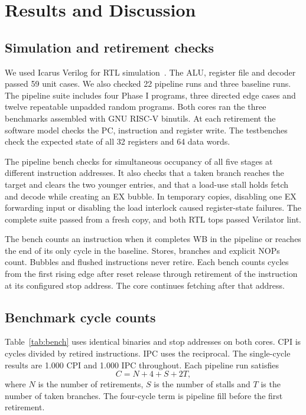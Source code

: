 \documentclass[conference]{IEEEtran}
\begin{document}
\section{Results and Discussion}
\subsection{Simulation and retirement checks}
We used Icarus Verilog for RTL simulation~\cite{icarus}. The ALU, register file and decoder passed 59 unit cases. We also checked 22 pipeline runs and three baseline runs. The pipeline suite includes four Phase I programs, three directed edge cases and twelve repeatable unpadded random programs. Both cores ran the three benchmarks assembled with GNU RISC-V binutils. At each retirement the software model checks the PC, instruction and register write. The testbenches check the expected state of all 32 registers and 64 data words.

The pipeline bench checks for simultaneous occupancy of all five stages at different instruction addresses. It also checks that a taken branch reaches the target and clears the two younger entries, and that a load-use stall holds fetch and decode while creating an EX bubble. In temporary copies, disabling one EX forwarding input or disabling the load interlock caused register-state failures. The complete suite passed from a fresh copy, and both RTL tops passed Verilator lint.

The bench counts an instruction when it completes WB in the pipeline or reaches the end of its only cycle in the baseline. Stores, branches and explicit NOPs count. Bubbles and flushed instructions never retire. Each bench counts cycles from the first rising edge after reset release through retirement of the instruction at its configured stop address. The core continues fetching after that address.

\subsection{Benchmark cycle counts}
Table~\ref{tab:bench} uses identical binaries and stop addresses on both cores. CPI is cycles divided by retired instructions. IPC uses the reciprocal. The single-cycle results are 1.000 CPI and 1.000 IPC throughout. Each pipeline run satisfies
\[
C = N + 4 + S + 2T ,
\]
where $N$ is the number of retirements, $S$ is the number of stalls and $T$ is the number of taken branches. The four-cycle term is pipeline fill before the first retirement.
\end{document}
